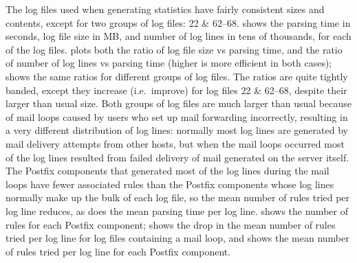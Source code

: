 The \numberOFlogFILES{} log files used when generating statistics have
fairly consistent sizes and contents, except for two groups of log files:
22 \& 62--68.   shows the parsing time in seconds, log file size in MB, and
number of log lines in tens of thousands, for each of the
\numberOFlogFILES{} log files.   plots both the ratio of log file size vs
parsing time, and the ratio of number of log lines vs parsing time (higher
is more efficient in both cases);  shows the same ratios for different
groups of log files.  The ratios are quite tightly banded, except they
increase (i.e.\ improve) for log files 22 \& 62--68, despite their larger
than usual size.  Both groups of log files are much larger than usual
because of mail loops caused by users who set up mail forwarding
incorrectly, resulting in a very different distribution of log lines:
normally most log lines are generated by mail delivery attempts from other
hosts, but when the mail loops occurred most of the log lines resulted from
failed delivery of mail generated on the server itself.  The Postfix
components that generated most of the log lines during the mail loops have
fewer associated rules than the Postfix components whose log lines normally
make up the bulk of each log file, so the mean number of rules tried per
log line reduces, as does the mean parsing time per log line.
 shows the number of rules
for each Postfix component;  shows the drop in the mean number of rules tried per log line for log
files containing a mail loop, and  shows the mean number of rules tried
per log line for each Postfix component.




